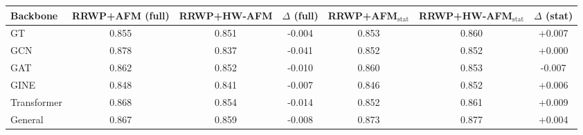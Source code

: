 \begin{tabular}{l c c c c c c}
\toprule
Backbone & RRWP+AFM (full) & RRWP+HW-AFM & $\Delta$ (full) & RRWP+AFM$_{\text{stat}}$ & RRWP+HW-AFM$_{\text{stat}}$ & $\Delta$ (stat) \\
\midrule
GT & 0.855 & 0.851 & -0.004 & 0.853 & 0.860 & +0.007 \\
GCN & 0.878 & 0.837 & -0.041 & 0.852 & 0.852 & +0.000 \\
GAT & 0.862 & 0.852 & -0.010 & 0.860 & 0.853 & -0.007 \\
GINE & 0.848 & 0.841 & -0.007 & 0.846 & 0.852 & +0.006 \\
Transformer & 0.868 & 0.854 & -0.014 & 0.852 & 0.861 & +0.009 \\
General & 0.867 & 0.859 & -0.008 & 0.873 & 0.877 & +0.004 \\
\bottomrule
\end{tabular}
